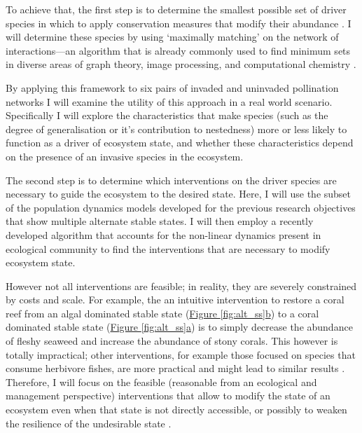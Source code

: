 \documentclass[a4paper]{article}
\begin{document}
To achieve that, the first step is to determine the smallest possible set of driver species in which to apply conservation measures that modify their abundance \autocite{Liu2011, Isbell2013}.
I will determine these species by using `maximally matching' on the network of interactions---an algorithm that is already commonly used to find minimum sets in diverse areas of graph theory, image processing, and computational chemistry \autocite{Hopcroft1973,Neumann2010}.

By applying this framework to six pairs of invaded and uninvaded pollination networks \autocite{Bartomeus2008} I will examine the utility of this approach in a real world scenario.
Specifically I will explore the characteristics that make species (such as the degree of generalisation or it's contribution to nestedness) more or less likely to function as a driver of ecosystem state, and whether these characteristics depend on the presence of an invasive species in the ecosystem.

The second step is to determine which interventions on the driver species are necessary to guide the ecosystem to the desired state.
Here, I will use the subset of the population dynamics models developed for the previous research objectives that show multiple alternate stable states.
I will then employ a recently developed algorithm that accounts for the non-linear dynamics present in ecological community \autocite{Cornelius2013, Cornelius2013a} to find the interventions that are necessary to modify ecosystem state.

However not all interventions are feasible; in reality, they are severely constrained by costs and scale.
For example, the an intuitive intervention to restore a coral reef from an algal dominated stable state (\hyperref[fig:alt_ss]{Figure \ref{fig:alt_ss}b}) to a coral dominated stable state (\hyperref[fig:alt_ss]{Figure \ref{fig:alt_ss}a}) is to simply decrease the abundance of fleshy seaweed and increase the abundance of stony corals.
This however is totally impractical; other interventions, for example those focused on species that consume herbivore fishes, are more practical and might lead to similar results \autocite{Bennett2015}.
Therefore, I will focus on the feasible (reasonable from an ecological and management perspective) interventions that allow to modify the state of an ecosystem even when that state is not directly accessible, or possibly to weaken the resilience of the undesirable state \autocite{Graham2013a, Standish2014a, Selkoe2015}.
\end{document}
